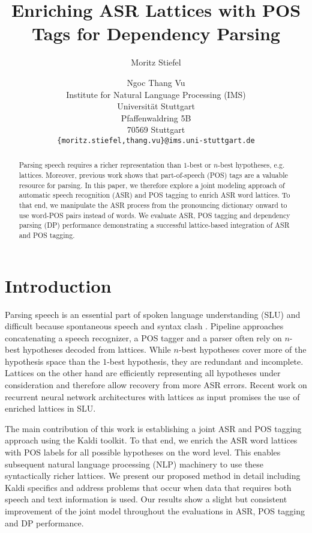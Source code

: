 \documentclass[11pt,letterpaper]{article}
\title{Enriching ASR Lattices with POS Tags for Dependency Parsing}
\author{Moritz Stiefel \and Ngoc Thang Vu \\
    Institute for Natural Language Processing (IMS) \\
    Universit\"{a}t Stuttgart \\
    Pfaffenwaldring 5B \\
    70569 Stuttgart \\
    {\tt {\{moritz.stiefel,thang.vu\}}@ims.uni-stuttgart.de}}
\date{}
\begin{document}
\maketitle

\begin{abstract}
Parsing speech requires a richer representation than $1$-best or $n$-best hypotheses, e.g. lattices. Moreover, previous work shows that part-of-speech (POS) tags are a valuable resource for parsing.
In this paper, we therefore explore a joint modeling approach of automatic speech recognition (ASR) and POS tagging to enrich ASR word lattices.
To that end, we manipulate the ASR process from the pronouncing dictionary onward to use word-POS pairs instead of words. 
We evaluate ASR, POS tagging and dependency parsing (DP) performance demonstrating a successful lattice-based integration of ASR and POS tagging.
\end{abstract}

\section{Introduction}\label{sec:intro}
Parsing speech is an essential part \citep[][]{ChowRoukos:1989,MooreEtal:1989,SuEtal:1992,ChappelierEtal:1999,CollinsEtal:2004} of spoken language understanding (SLU) and difficult because spontaneous speech and syntax clash \citep[][]{EhrlichHanrieder:1996,CharniakJohnson:2001,BechetEtal:2014:is}. Pipeline approaches concatenating a speech recognizer, a POS tagger and a parser often rely on $n$-best hypotheses decoded from lattices. While $n$-best hypotheses cover more of the hypothesis space than the $1$-best hypothesis, they are redundant and incomplete. Lattices on the other hand are efficiently representing all hypotheses under consideration and therefore allow recovery from more ASR errors. Recent work on recurrent neural network architectures with lattices as input \citep{LadhakEtal:2016,SuEtal:2017} promises the use of enriched lattices in SLU.

The main contribution of this work is establishing a joint ASR and POS tagging approach using the Kaldi \citep{PoveyEtal:2011} toolkit. To that end, we enrich the ASR word lattices with POS labels for all possible hypotheses on the word level. This enables subsequent natural language processing (NLP) machinery to use these syntactically richer lattices. We present our proposed method in detail including Kaldi specifics and address problems that occur when data that requires both speech and text information is used. Our results show a slight but consistent improvement of the joint model throughout the evaluations in ASR, POS tagging and DP performance.
\end{document}

